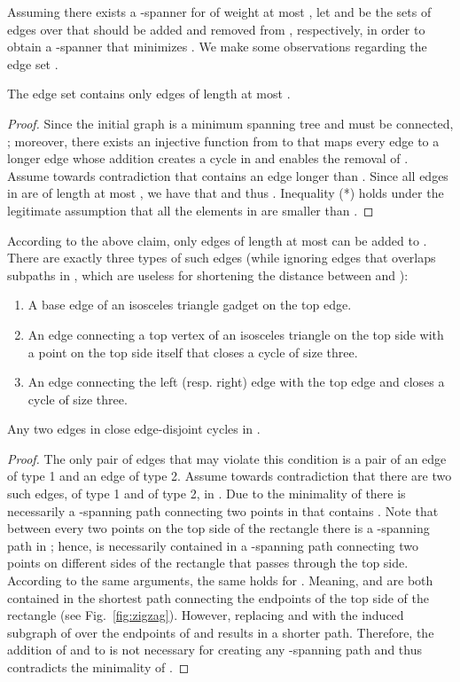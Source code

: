 \documentclass[a4paper]{llncs}
\begin{document}
Assuming there exists a -spanner for  of weight at most ,
let  and  be the sets of edges over  that should be added and removed 
from , respectively, in order to obtain a -spanner  
that minimizes .
We make some observations regarding the edge set .

\begin{myclaim}\label{cl:short_edges}
The edge set  contains only edges of length at most .
\end{myclaim}

\begin{proof}
Since the initial graph is a minimum spanning tree and  must be connected, ; 
moreover, there exists an injective function from  to  
that maps every edge  to a longer edge  
whose addition creates a cycle in  and enables the removal of . 
Assume towards contradiction that  contains an edge  longer than .
Since all edges in  are of length at most ,
we have that 
and thus . Inequality (*) holds under the legitimate assumption that all the elements in  are
smaller than .
\end{proof}

According to the above claim, only edges of length at most  can be added to .
There are exactly three types of such edges 
(while ignoring edges that overlaps subpaths in , 
which are useless for shortening the distance between  and ):

\begin{enumerate}
\item A base edge of an isosceles triangle gadget on the top edge.
\item An edge connecting a top vertex of an isosceles triangle on the top side 
			with a point on the top side itself that closes a cycle of size three.
\item An edge connecting the left (resp. right) edge with the top edge 
			and closes a cycle of size three.
\end{enumerate} 

\begin{observation}\label{obs:disjoint}
Any two edges in  close edge-disjoint cycles in .
\end{observation}

\begin{proof}
The only pair of edges that may violate this condition is a pair of an edge of type 1 
and an edge of type 2.
Assume towards contradiction that there are two such edges, 
 of type 1 and  of type 2, in .
Due to the minimality of  there is necessarily a -spanning path 
connecting two points in  that contains . 
Note that between every two points on the top side of the rectangle there is 
a -spanning path in ; hence,  is necessarily contained in 
a -spanning path connecting two points on different sides of the rectangle
that passes through the top side.
According to the same arguments, the same holds for . 
Meaning,  and  are both contained in the shortest path connecting
the endpoints of the top side of the rectangle (see Fig.~\ref{fig:zigzag}).
However, replacing  and  with the induced subgraph of  
over the endpoints of  and  results in a shorter path.
Therefore, the addition of  and  to  is not necessary for
creating any -spanning path and thus contradicts the minimality of .
\end{proof}
\end{document}
